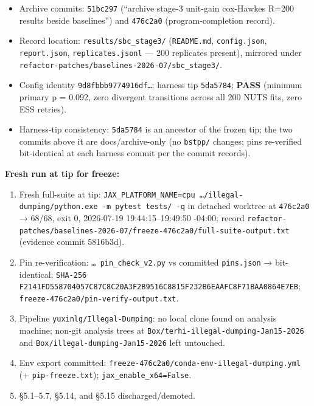 \documentclass[
  10pt,
]{article}
\providecommand{\tightlist}{%
  \setlength{\itemsep}{0pt}\setlength{\parskip}{0pt}}
\begin{document}
\begin{itemize}
\tightlist
\item
  Archive commits: \texttt{51bc297} (``archive stage-3 unit-gain cox-Hawkes R=200 results beside baselines'') and \texttt{476c2a0} (program-completion record).
\item
  Record location: \texttt{results/sbc\_stage3/} (\texttt{README.md}, \texttt{config.json}, \texttt{report.json}, \texttt{replicates.jsonl} --- 200 replicates present), mirrored under \texttt{refactor-patches/\allowbreak{}baselines-2026-07/\allowbreak{}sbc\_\allowbreak{}stage3/\allowbreak{}}.
\item
  Config identity \texttt{9d8fbbb9774916df…}; harness tip \texttt{5da5784}; \textbf{PASS} (minimum primary p = 0.092, zero divergent transitions across all 200 NUTS fits, zero ESS retries).
\item
  Harness-tip consistency: \texttt{5da5784} is an ancestor of the frozen tip; the two commits above it are docs/archive-only (no \texttt{bstpp/} changes; pins re-verified bit-identical at each harness commit per the commit records).
\end{itemize}

\textbf{Fresh run at tip for freeze:}

\begin{enumerate}
\def\labelenumi{\arabic{enumi}.}
\tightlist
\item
  Fresh full-suite at tip: \texttt{JAX\_PLATFORM\_NAME=cpu …/illegal-dumping/python.exe -m pytest tests/ -q} in detached worktree at \texttt{476c2a0} → 68/68, exit 0, 2026-07-19 19:44:15–19:49:50 -04:00; record \texttt{refactor-patches/baselines-2026-07/freeze-476c2a0/full-suite-output.txt} (evidence commit 5816b3d).
\item
  Pin re-verification: \texttt{… pin\_check\_v2.py} vs committed \texttt{pins.json} → bit-identical; \texttt{SHA-256 F2141FD558704057C87C8C20A3F2B9516C8815F232B6EAAFC8F71BAA0864E7EB}; \texttt{freeze-476c2a0/pin-verify-output.txt}.
\item
  Pipeline \texttt{yuxinlg/Illegal-Dumping}: no local clone found on analysis machine; non-git analysis trees at \texttt{Box/terhi-illegal-dumping-Jan15-2026} and \texttt{Box/illegal-dumping-Jan15-2026} left untouched.
\item
  Env export committed: \texttt{freeze-476c2a0/conda-env-illegal-dumping.yml} (+ \texttt{pip-freeze.txt}); \texttt{jax\_enable\_x64=False}.
\item
  §5.1–5.7, §5.14, and §5.15 discharged/demoted.
\end{enumerate}
\end{document}
